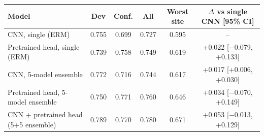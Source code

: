 \begin{tabular}{lccccc}
\toprule
Model & Dev & Conf. & All & Worst site & $\Delta$ vs single CNN [95\% CI] \\
\midrule
CNN, single (ERM) & 0.755 & 0.699 & 0.727 & 0.595 & -- \\
Pretrained head, single (ERM) & 0.739 & 0.758 & 0.749 & 0.619 & +0.022 [\ensuremath{-}0.079, +0.133] \\
CNN, 5-model ensemble & 0.772 & 0.716 & 0.744 & 0.617 & +0.017 [+0.006, +0.030] \\
Pretrained head, 5-model ensemble & 0.750 & 0.771 & 0.760 & 0.646 & +0.034 [\ensuremath{-}0.070, +0.149] \\
CNN + pretrained head (5+5 ensemble) & 0.789 & 0.770 & 0.780 & 0.671 & +0.053 [\ensuremath{-}0.013, +0.129] \\
\bottomrule
\end{tabular}